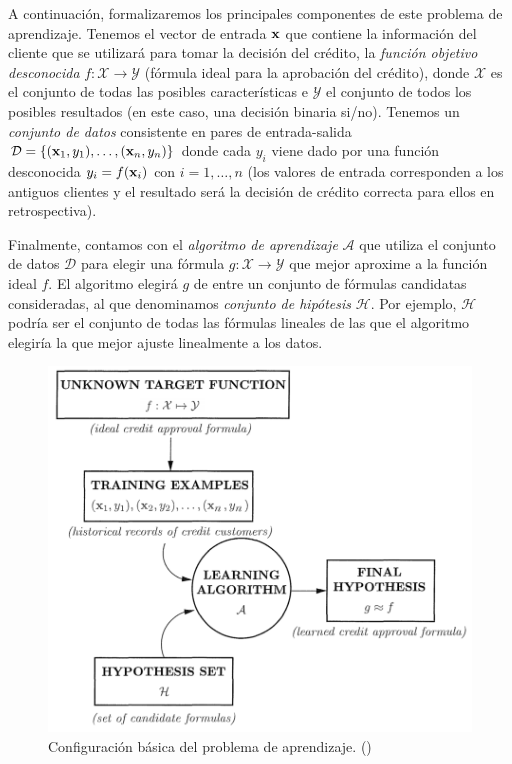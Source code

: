 \documentclass[oneside,openright,titlepage,numbers=noenddot,openany,headinclude,footinclude=true,
cleardoublepage=empty,abstractoff,BCOR=5mm,paper=a4,fontsize=12pt,main=spanish]{scrreprt}
\begin{document}
A continuación, formalizaremos los principales componentes de este problema de aprendizaje. Tenemos el vector de entrada $\textbf{x}$ que contiene la información del cliente que se utilizará para tomar la decisión del crédito, la \textit{función objetivo desconocida} $f\colon \mathcal{X}\to \mathcal{Y}$ (fórmula ideal para la aprobación del crédito), donde $\mathcal{X}$ es el conjunto de todas las posibles características e $\mathcal{Y}$ el conjunto de todos los posibles resultados (en este caso, una decisión binaria si/no). Tenemos un \textit{conjunto de datos} consistente en pares de entrada-salida $\mathcal{D}=\{(\textbf{x}_1,y_1),\dots,(\textbf{x}_n,y_n)\}$ donde cada  $y_i$ viene dado por una función desconocida $y_i=f(\textbf{x}_i)$ con $i=1,\dots,n$ (los valores de entrada corresponden a los antiguos clientes y el resultado será la decisión de crédito correcta para ellos en retrospectiva).

Finalmente, contamos con el \textit{algoritmo de aprendizaje} $\mathcal{A}$ que utiliza el conjunto de datos $\mathcal{D}$ para elegir una fórmula $g\colon \mathcal{X}\to \mathcal{Y}$ que mejor aproxime a la función ideal $f$. El algoritmo elegirá $g$ de entre un conjunto de fórmulas candidatas consideradas, al que denominamos \textit{conjunto de hipótesis} $\mathcal{H}$. Por ejemplo, $\mathcal{H}$ podría ser el conjunto de todas las fórmulas lineales de las que el algoritmo elegiría la que mejor ajuste linealmente a los datos.\\

\begin{figure}[h]
	\centering
	\includegraphics[width=12.6cm]{setup_learning.png}
	\caption{Configuración básica del problema de aprendizaje. (\cite{learning2012})}
    \label{fig:learningesq}
\end{figure}
\end{document}
